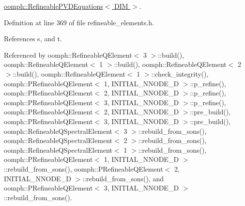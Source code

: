 \hyperlink{classoomph_1_1RefineablePVDEquations_a2e49057699c62727015cdbf1343be157}{oomph\+::\+Refineable\+P\+V\+D\+Equations$<$ D\+I\+M $>$}.



Definition at line 369 of file refineable\+\_\+elements.\+h.



References s, and t.



Referenced by oomph\+::\+Refineable\+Q\+Element$<$ 3 $>$\+::build(), oomph\+::\+Refineable\+Q\+Element$<$ 1 $>$\+::build(), oomph\+::\+Refineable\+Q\+Element$<$ 2 $>$\+::build(), oomph\+::\+Refineable\+Q\+Element$<$ 1 $>$\+::check\+\_\+integrity(), oomph\+::\+P\+Refineable\+Q\+Element$<$ 1, I\+N\+I\+T\+I\+A\+L\+\_\+\+N\+N\+O\+D\+E\+\_\+D $>$\+::p\+\_\+refine(), oomph\+::\+P\+Refineable\+Q\+Element$<$ 2, I\+N\+I\+T\+I\+A\+L\+\_\+\+N\+N\+O\+D\+E\+\_\+D $>$\+::p\+\_\+refine(), oomph\+::\+P\+Refineable\+Q\+Element$<$ 3, I\+N\+I\+T\+I\+A\+L\+\_\+\+N\+N\+O\+D\+E\+\_\+D $>$\+::p\+\_\+refine(), oomph\+::\+P\+Refineable\+Q\+Element$<$ 2, I\+N\+I\+T\+I\+A\+L\+\_\+\+N\+N\+O\+D\+E\+\_\+D $>$\+::pre\+\_\+build(), oomph\+::\+P\+Refineable\+Q\+Element$<$ 3, I\+N\+I\+T\+I\+A\+L\+\_\+\+N\+N\+O\+D\+E\+\_\+D $>$\+::pre\+\_\+build(), oomph\+::\+Refineable\+Q\+Spectral\+Element$<$ 3 $>$\+::rebuild\+\_\+from\+\_\+sons(), oomph\+::\+Refineable\+Q\+Spectral\+Element$<$ 2 $>$\+::rebuild\+\_\+from\+\_\+sons(), oomph\+::\+Refineable\+Q\+Spectral\+Element$<$ 1 $>$\+::rebuild\+\_\+from\+\_\+sons(), oomph\+::\+P\+Refineable\+Q\+Element$<$ 1, I\+N\+I\+T\+I\+A\+L\+\_\+\+N\+N\+O\+D\+E\+\_\+D $>$\+::rebuild\+\_\+from\+\_\+sons(), oomph\+::\+P\+Refineable\+Q\+Element$<$ 2, I\+N\+I\+T\+I\+A\+L\+\_\+\+N\+N\+O\+D\+E\+\_\+D $>$\+::rebuild\+\_\+from\+\_\+sons(), and oomph\+::\+P\+Refineable\+Q\+Element$<$ 3, I\+N\+I\+T\+I\+A\+L\+\_\+\+N\+N\+O\+D\+E\+\_\+D $>$\+::rebuild\+\_\+from\+\_\+sons().

\mbox{\label{classoomph_1_1RefineableElement_ada6f0efe831ffefb1d2829ce01d45bfc}} 
